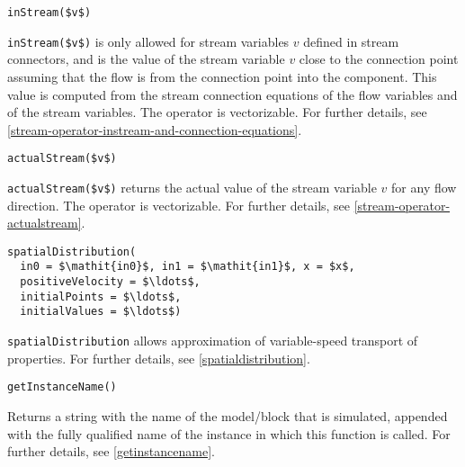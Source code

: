 \begin{operatordefinition}[inStream]
\begin{synopsis}\begin{lstlisting}
inStream($v$)
\end{lstlisting}\end{synopsis}
\begin{semantics}
\lstinline!inStream($v$)! is only allowed for stream variables $v$ defined in stream connectors, and is the value of the stream variable $v$ close to the connection point assuming that the flow is from the connection point into the component.
This value is computed from the stream connection equations of the flow variables and of the stream variables.
The operator is vectorizable.
For further details, see \cref{stream-operator-instream-and-connection-equations}.
\end{semantics}
\end{operatordefinition}

\begin{operatordefinition}[actualStream]
\begin{synopsis}\begin{lstlisting}
actualStream($v$)
\end{lstlisting}\end{synopsis}
\begin{semantics}
\lstinline!actualStream($v$)! returns the actual value of the stream variable $v$ for any flow direction.
The operator is vectorizable.
For further details, see \cref{stream-operator-actualstream}.
\end{semantics}
\end{operatordefinition}

\begin{operatordefinition}[spatialDistribution]
\begin{synopsis}\begin{lstlisting}
spatialDistribution(
  in0 = $\mathit{in0}$, in1 = $\mathit{in1}$, x = $x$,
  positiveVelocity = $\ldots$,
  initialPoints = $\ldots$,
  initialValues = $\ldots$)
\end{lstlisting}\end{synopsis}
\begin{semantics}
\lstinline!spatialDistribution! allows approximation of variable-speed transport of properties.
For further details, see \cref{spatialdistribution}.
\end{semantics}
\end{operatordefinition}

\begin{operatordefinition}[getInstanceName]
\begin{synopsis}\begin{lstlisting}
getInstanceName()
\end{lstlisting}\end{synopsis}
\begin{semantics}
Returns a string with the name of the model/block that is simulated, appended with the fully qualified name of the instance in which this function is called.
For further details, see \cref{getinstancename}.
\end{semantics}
\end{operatordefinition}

